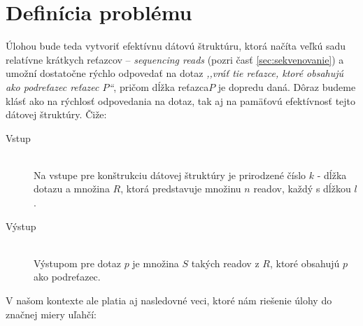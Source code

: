 

\section{Definícia problému}
\label{sec:definicia_problemu}

Úlohou bude teda vytvoriť efektívnu dátovú štruktúru, ktorá načíta veľkú sadu
relatívne krátkych reťazcov -- \emph{sequencing reads} (pozri časť \ref{sec:sekvenovanie}) a umožní dostatočne rýchlo odpovedať na dotaz \emph{,,vráť tie
reťazce, ktoré obsahujú ako podreťazec reťazec $P$``}, pričom dĺžka reťazca$P$
je dopredu daná. Dôraz budeme klásť ako na rýchlosť odpovedania na dotaz, tak aj
na pamäťovú efektívnosť tejto dátovej štruktúry. Čiže:

\begin{description}
    \item[Vstup] \hfill \\
        Na vstupe pre konštrukciu dátovej štruktúry je prirodzené číslo $k$ -
        dĺžka dotazu a množina $R$, ktorá predstavuje množinu $n$ readov,
        každý s dĺžkou $l$.
    \item[Výstup] \hfill \\
        Výstupom pre dotaz $p$ je množina $S$ takých readov z $R$, ktoré
        obsahujú $p$ ako podreťazec.
\end{description}

V našom kontexte ale platia aj nasledovné veci, ktoré nám riešenie úlohy do
značnej miery uľahčí:

